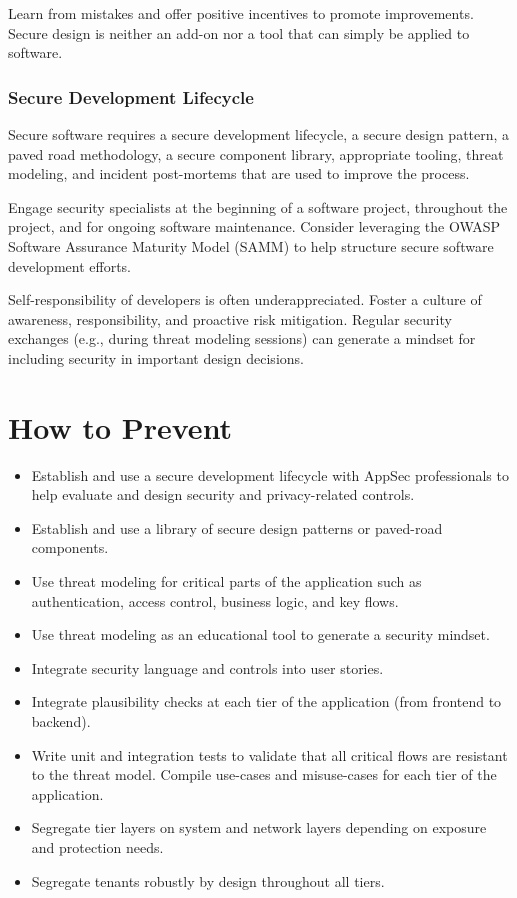 \documentclass[11pt]{article}
\begin{document}
Learn from mistakes and offer positive incentives to promote improvements. Secure design is neither an add-on nor a tool that can simply be applied to software.

\subsubsection{Secure Development Lifecycle}
Secure software requires a secure development lifecycle, a secure design pattern, a paved road methodology, a secure component library, appropriate tooling, threat modeling, and incident post-mortems that are used to improve the process.

Engage security specialists at the beginning of a software project, throughout the project, and for ongoing software maintenance. Consider leveraging the OWASP Software Assurance Maturity Model (SAMM) to help structure secure software development efforts.

\begin{infobox}
Self-responsibility of developers is often underappreciated. Foster a culture of awareness, responsibility, and proactive risk mitigation. Regular security exchanges (e.g., during threat modeling sessions) can generate a mindset for including security in important design decisions.
\end{infobox}

\section{How to Prevent}
\begin{itemize}
  \item Establish and use a secure development lifecycle with AppSec professionals to help evaluate and design security and privacy-related controls.
  \item Establish and use a library of secure design patterns or paved-road components.
  \item Use threat modeling for critical parts of the application such as authentication, access control, business logic, and key flows.
  \item Use threat modeling as an educational tool to generate a security mindset.
  \item Integrate security language and controls into user stories.
  \item Integrate plausibility checks at each tier of the application (from frontend to backend).
  \item Write unit and integration tests to validate that all critical flows are resistant to the threat model. Compile use-cases and misuse-cases for each tier of the application.
  \item Segregate tier layers on system and network layers depending on exposure and protection needs.
  \item Segregate tenants robustly by design throughout all tiers.
\end{itemize}
\end{document}
